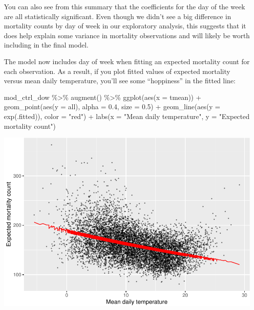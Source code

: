 \documentclass[
]{book}
\newenvironment{Shaded}{\begin{snugshade}}{\end{snugshade}}
\newcommand{\AttributeTok}[1]{\textcolor[rgb]{0.77,0.63,0.00}{#1}}
\newcommand{\FloatTok}[1]{\textcolor[rgb]{0.00,0.00,0.81}{#1}}
\newcommand{\FunctionTok}[1]{\textcolor[rgb]{0.00,0.00,0.00}{#1}}
\newcommand{\NormalTok}[1]{#1}
\newcommand{\SpecialCharTok}[1]{\textcolor[rgb]{0.00,0.00,0.00}{#1}}
\newcommand{\StringTok}[1]{\textcolor[rgb]{0.31,0.60,0.02}{#1}}
\begin{document}
You can also see from this summary that the coefficients for the day of the
week are all statistically significant. Even though we didn't see a big
difference in mortality counts by day of week in our exploratory analysis,
this suggests that it does help explain some variance in mortality observations
and will likely be worth including in the final model.

The model now includes day of week when fitting an expected mortality count
for each observation. As a result, if you plot fitted values of expected
mortality versus mean daily temperature, you'll see some ``hoppiness'' in the
fitted line:

\begin{Shaded}
\begin{Highlighting}[]
\NormalTok{mod\_ctrl\_dow }\SpecialCharTok{\%\textgreater{}\%} 
  \FunctionTok{augment}\NormalTok{() }\SpecialCharTok{\%\textgreater{}\%} 
  \FunctionTok{ggplot}\NormalTok{(}\FunctionTok{aes}\NormalTok{(}\AttributeTok{x =}\NormalTok{ tmean)) }\SpecialCharTok{+} 
  \FunctionTok{geom\_point}\NormalTok{(}\FunctionTok{aes}\NormalTok{(}\AttributeTok{y =}\NormalTok{ all), }\AttributeTok{alpha =} \FloatTok{0.4}\NormalTok{, }\AttributeTok{size =} \FloatTok{0.5}\NormalTok{) }\SpecialCharTok{+} 
  \FunctionTok{geom\_line}\NormalTok{(}\FunctionTok{aes}\NormalTok{(}\AttributeTok{y =} \FunctionTok{exp}\NormalTok{(.fitted)), }\AttributeTok{color =} \StringTok{"red"}\NormalTok{) }\SpecialCharTok{+} 
  \FunctionTok{labs}\NormalTok{(}\AttributeTok{x =} \StringTok{"Mean daily temperature"}\NormalTok{, }\AttributeTok{y =} \StringTok{"Expected mortality count"}\NormalTok{)}
\end{Highlighting}
\end{Shaded}

\includegraphics{adv_epi_analysis_files/figure-latex/unnamed-chunk-39-1.pdf}
\end{document}
